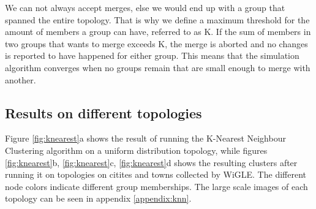 We can not always accept merges, else we would end up with a group that spanned the entire topology. That is why we define a maximum threshold for the amount of members a group can have, 
referred to as K. If the sum of members in two groups that wants to merge exceeds K, the merge is aborted and no changes is reported to have happened for either group. 
This means that the simulation algorithm converges when no groups remain that are small enough to merge with another.
 
\subsection{Results on different topologies}
Figure \ref{fig:knearest}a shows the result of running the K-Nearest Neighbour Clustering algorithm on a uniform distribution topology, while figures \ref{fig:knearest}b, \ref{fig:knearest}c, \ref{fig:knearest}d shows the resulting clusters after running it on topologies on citites and towns collected by WiGLE. The different node colors indicate different group memberships. The large scale images of each topology can be seen in appendix \ref{appendix:knn}.


